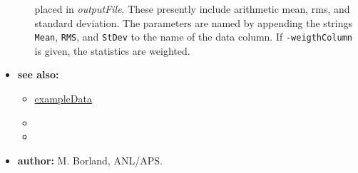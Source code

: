 \begin{itemize}
\begin{itemize}
        placed in {\em outputFile}.  These presently include arithmetic mean, rms, and standard deviation.
        The parameters are named by appending the strings {\tt Mean}, {\tt RMS}, and {\tt StDev} to the
        name of the data column.  If {\tt -weigthColumn} is given, the statistics are weighted.  
    \end{itemize}
\item {\bf see also:}
    \begin{itemize}
    \item \hyperref{Data for Examples}{Data for Examples (see }{)}{exampleData}
    \item {}
    \item {}
    \end{itemize}
\item {\bf author:} M. Borland, ANL/APS.
\end{itemize}

